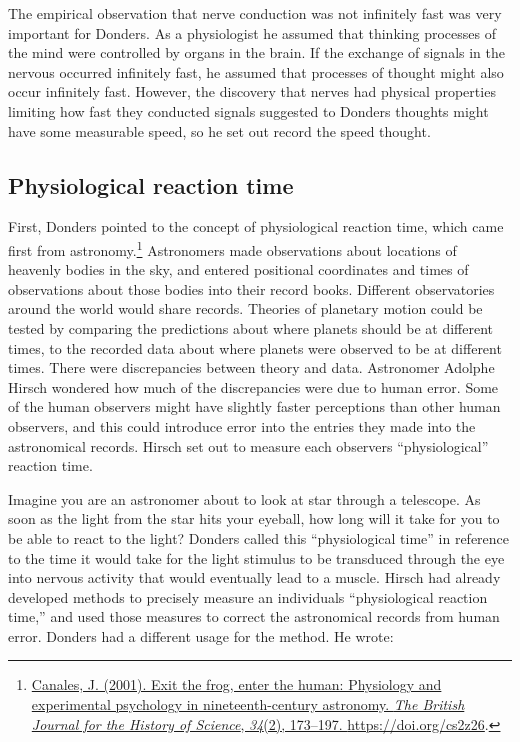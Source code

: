 \documentclass[
  oneside,
  12pt]{crumpbook}
\begin{document}
The empirical observation that nerve conduction was not infinitely fast was very important for Donders. As a physiologist he assumed that thinking processes of the mind were controlled by organs in the brain. If the exchange of signals in the nervous occurred infinitely fast, he assumed that processes of thought might also occur infinitely fast. However, the discovery that nerves had physical properties limiting how fast they conducted signals suggested to Donders thoughts might have some measurable speed, so he set out record the speed thought.

\hypertarget{physiological-reaction-time}{%
\subsection{Physiological reaction time}\label{physiological-reaction-time}}

First, Donders pointed to the concept of physiological reaction time, which came first from astronomy.\footnote{\protect\hyperlink{ref-canalesExitFrogEnter2001}{Canales, J. (2001). Exit the frog, enter the human: Physiology and experimental psychology in nineteenth-century astronomy. \emph{The British Journal for the History of Science}, \emph{34}(2), 173--197. \url{https://doi.org/cs2z26}}.} Astronomers made observations about locations of heavenly bodies in the sky, and entered positional coordinates and times of observations about those bodies into their record books. Different observatories around the world would share records. Theories of planetary motion could be tested by comparing the predictions about where planets should be at different times, to the recorded data about where planets were observed to be at different times. There were discrepancies between theory and data. Astronomer Adolphe Hirsch wondered how much of the discrepancies were due to human error. Some of the human observers might have slightly faster perceptions than other human observers, and this could introduce error into the entries they made into the astronomical records. Hirsch set out to measure each observers ``physiological'' reaction time.

Imagine you are an astronomer about to look at star through a telescope. As soon as the light from the star hits your eyeball, how long will it take for you to be able to react to the light? Donders called this ``physiological time'' in reference to the time it would take for the light stimulus to be transduced through the eye into nervous activity that would eventually lead to a muscle. Hirsch had already developed methods to precisely measure an individuals ``physiological reaction time,'' and used those measures to correct the astronomical records from human error. Donders had a different usage for the method. He wrote:
\end{document}

